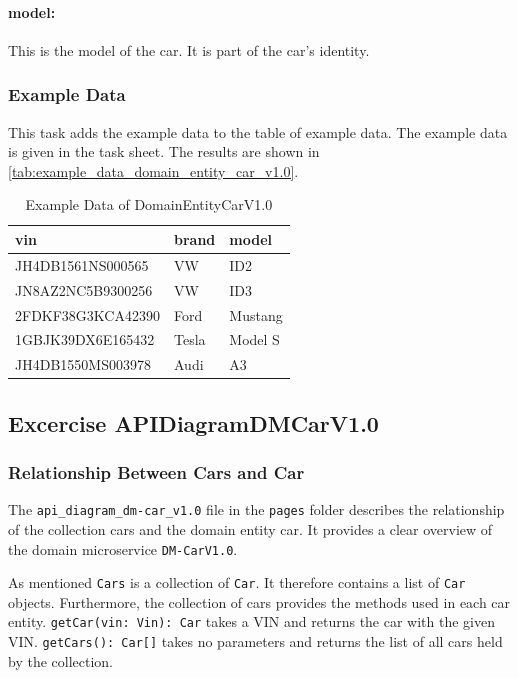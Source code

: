 \paragraph*{model:}
This is the model of the car.
It is part of the car's identity.

\subsubsection*{Example Data}
This task adds the example data to the table of example data.
The example data is given in the task sheet.
The results are shown in \autoref{tab:example_data_domain_entity_car_v1.0}.
\begin{table}
    \centering
    \caption{Example Data of DomainEntityCarV1.0}
    \label{tab:example_data_domain_entity_car_v1.0}
    \begin{tabular}{|p{5cm}|p{2cm}|p{2cm}|}
        \hline
        vin & brand & model \\
        \hline
        JH4DB1561NS000565 & VW & ID2 \\
        JN8AZ2NC5B9300256 & VW & ID3 \\
        2FDKF38G3KCA42390 & Ford & Mustang \\
        1GBJK39DX6E165432 & Tesla & Model S \\
        JH4DB1550MS003978 & Audi & A3 \\
        \hline
    \end{tabular}
\end{table}

\subsection{Excercise APIDiagramDMCarV1.0}
\label{subsec:api_diagram_dm_car_v1.0}
\subsubsection*{Relationship Between Cars and Car}
The \texttt{api\_diagram\_dm-car\_v1.0} file in the \texttt{pages} folder describes the relationship of the collection cars and the domain entity car.
It provides a clear overview of the domain microservice \texttt{DM-CarV1.0}.

As mentioned \texttt{Cars} is a collection of \texttt{Car}.
It therefore contains a list of \texttt{Car} objects.
Furthermore, the collection of cars provides the methods used in each car entity.
\texttt{getCar(vin: Vin): Car} takes a VIN and returns the car with the given VIN.
\texttt{getCars(): Car[]} takes no parameters and returns the list of all cars held by the collection.

